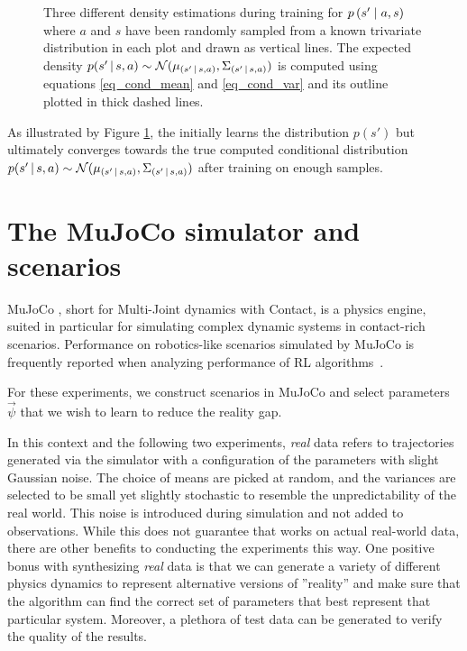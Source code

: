 \begin{figure}
\caption[]{Three different density estimations during training for \ensuremath{p \given*{s'}{a,s}} where $a$ and $s$ have been randomly sampled from a known trivariate distribution in each plot and drawn as vertical lines. The expected density $p \given{s'}{s, a} \sim \N (\mu_{\given{s'}{s,a}}, \Sigma_{\given{s'}{s,a}})$ is computed using equations \ref{eq_cond_mean} and \ref{eq_cond_var} and its outline plotted in thick dashed lines.}
\label{fig:trivariate_density}
\end{figure}

As illustrated by Figure \ref{fig:trivariate_density}, the \cvae{} initially learns the distribution $p(s')$ but ultimately converges towards the true computed conditional distribution $p \given{s'}{s, a} \sim \N (\mu_{\given{s'}{s,a}}, \Sigma_{\given{s'}{s,a}})$ after training on enough samples. %

\section{The MuJoCo simulator and scenarios}

MuJoCo \parencite{todorov2012mujoco}, short for Multi-Joint dynamics with Contact, is a physics engine, suited in particular for simulating complex dynamic systems in contact-rich scenarios. Performance on robotics-like scenarios simulated by MuJoCo is frequently reported when analyzing performance of RL algorithms~\parencite{duan2016benchmarking, popov2017data}.

For these experiments, we construct scenarios in MuJoCo and select parameters $\vec{\psi}$ that we wish to learn to reduce the reality gap. %

In this context and the following two experiments, \textit{real} data refers to trajectories generated via the simulator with a configuration of the parameters with slight Gaussian noise. The choice of means are picked at random, and the variances are selected to be small yet slightly stochastic to resemble the unpredictability of the real world. This noise is introduced during simulation and not added to observations. While this does not guarantee that \dettostoc{} works on actual real-world data, there are other benefits to conducting the experiments this way. One positive bonus with synthesizing \emph{real} data is that we can generate a variety of different physics dynamics to represent alternative versions of ''reality'' and make sure that the algorithm can find the correct set of parameters that best represent that particular system. Moreover, a plethora of test data can be generated to verify the quality of the results.

